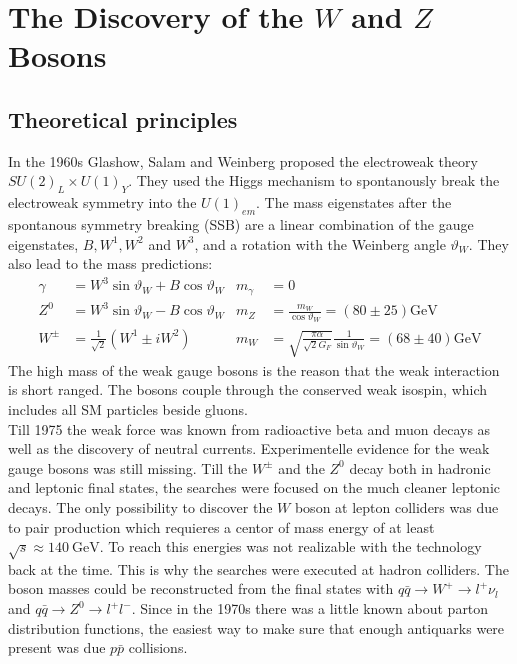 \section{The Discovery of the $W$ and $Z$ Bosons \cite{wz}}
\subsection{Theoretical principles}
In the 1960s Glashow, Salam and Weinberg proposed the electroweak theory $SU(2)_L\times U(1)_Y$. They used the Higgs mechanism to spontanously break the electroweak symmetry into the $U(1)_{em}$. The mass eigenstates after the spontanous symmetry breaking (SSB) are a linear combination of the gauge eigenstates, $B, W^1, W^2$ and $W^3$, and a rotation with the Weinberg angle $\vartheta_W$. They also lead to the mass predictions:
\begin{align*}
	\gamma &= W^3\sin \vartheta_W + B \cos \vartheta_W & m_{\gamma} &= 0\\
	Z^0 &= W^3\sin \vartheta_W - B \cos \vartheta_W & m_Z &= \frac{m_W}{\cos\vartheta_W} = (80\pm25)\si{\GeV}\\
	W^{\pm} &= \frac{1}{\sqrt{2}}(W^1 \pm iW^2) & m_W &= \sqrt{\frac{\pi\alpha}{\sqrt{2}G_F}}\frac{1}{\sin\vartheta_W} = (68\pm40)\si{\GeV}
\end{align*}
The high mass of the weak gauge bosons is the reason that the weak interaction is short ranged. The bosons couple through the conserved weak isospin, which includes all SM particles beside gluons. \\
Till 1975 the weak force was known from radioactive beta and muon decays as well as the discovery of neutral currents. Experimentelle evidence for the weak gauge bosons was still missing. Till the $W^{\pm}$ and the $Z^0$ decay both in hadronic and leptonic final states, the searches were focused on the much cleaner leptonic decays. The only possibility to discover the $W$ boson at lepton colliders was due to pair production which requieres a centor of mass energy of at least $\sqrt{s}\approx \SI{140}{\giga\electronvolt}$. To reach this energies was not realizable with the technology back at the time. This is why the searches were executed at hadron colliders. The boson masses could be reconstructed from the final states with $q\bar{q} \rightarrow W^{+} \rightarrow l^+\nu_l$ and $q\bar{q} \rightarrow Z^{0} \rightarrow l^+l^-$. Since in the 1970s there was a little known about parton distribution functions, the easiest way to make sure that enough antiquarks were present was due $p\bar{p}$ collisions.

